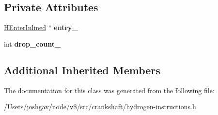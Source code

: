 \subsection*{Private Attributes}
\begin{DoxyCompactItemize}
\item 
\hyperlink{classv8_1_1internal_1_1_h_enter_inlined}{H\+Enter\+Inlined} $\ast$ {\bfseries entry\+\_\+}\hypertarget{classv8_1_1internal_1_1_h_leave_inlined_a03fcb7cf82a3748a085cb84e10e928d5}{}\label{classv8_1_1internal_1_1_h_leave_inlined_a03fcb7cf82a3748a085cb84e10e928d5}

\item 
int {\bfseries drop\+\_\+count\+\_\+}\hypertarget{classv8_1_1internal_1_1_h_leave_inlined_ac71ac0cb7814b765051922061c563407}{}\label{classv8_1_1internal_1_1_h_leave_inlined_ac71ac0cb7814b765051922061c563407}

\end{DoxyCompactItemize}
\subsection*{Additional Inherited Members}


The documentation for this class was generated from the following file\+:\begin{DoxyCompactItemize}
\item 
/\+Users/joshgav/node/v8/src/crankshaft/hydrogen-\/instructions.\+h\end{DoxyCompactItemize}
